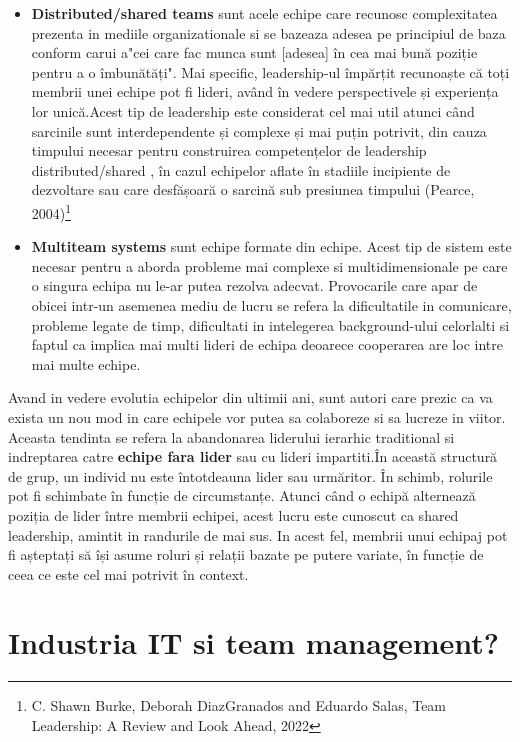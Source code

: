 \documentclass[a4paper, 12pt]{article}
\begin{document}
\begin{itemize}
	\item \textbf {Distributed/shared teams} sunt acele echipe care recunosc complexitatea prezenta in mediile organizationale si se bazeaza adesea pe principiul de baza conform carui a"cei care fac munca sunt [adesea] în cea mai bună poziție pentru a o îmbunătăți". Mai specific, leadership-ul împărțit recunoaște că toți membrii unei echipe pot fi lideri, având în vedere perspectivele și experiența lor unică.Acest tip de leadership este considerat cel mai util atunci când sarcinile sunt interdependente și complexe și mai puțin potrivit, din cauza timpului necesar pentru construirea competențelor de leadership distributed/shared , în cazul echipelor aflate în stadiile incipiente de dezvoltare sau care desfășoară o sarcină sub presiunea timpului (Pearce, 2004)\footnote{C. Shawn Burke, Deborah DiazGranados and Eduardo Salas, Team Leadership: A Review and Look Ahead, 2022}


	\item \textbf{Multiteam systems} sunt echipe formate din echipe. Acest tip de sistem este necesar pentru a aborda probleme mai complexe si multidimensionale pe care o singura echipa nu le-ar putea rezolva adecvat. Provocarile care apar de obicei intr-un asemenea mediu de lucru  se refera la dificultatile in comunicare, probleme legate de timp, dificultati in intelegerea background-ului celorlalti si faptul ca implica mai multi lideri de echipa deoarece cooperarea are loc intre mai multe echipe.
	
\end{itemize}

	\quad\quad Avand in vedere evolutia echipelor din ultimii ani, sunt autori care prezic ca va exista un nou mod in care echipele vor putea sa colaboreze si sa lucreze in viitor. Aceasta tendinta se refera la abandonarea liderului ierarhic traditional si indreptarea catre \textbf{echipe fara lider} sau cu lideri impartiti.În această structură de grup, un individ nu este întotdeauna lider sau urmăritor. În schimb, rolurile pot fi schimbate în funcție de circumstanțe. Atunci când o echipă alternează poziția de lider între membrii echipei, acest lucru este cunoscut ca shared leadership, amintit in randurile de mai sus. In acest fel, membrii unui echipaj pot fi așteptați să își asume roluri și relații bazate pe putere variate, în funcție de ceea ce este cel mai potrivit în context.

\newpage
	\setcounter{section}{1}
	\section{Industria IT si team management?}
\end{document}
